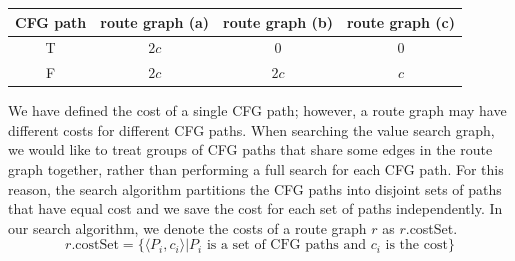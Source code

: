 \begin{center}
\begin{tabular}{|c|c|c|c|}
  \hline
  CFG path & route graph (a) & route graph (b) & route graph (c) \\
  \hline\hline
  T & $2c$ & $0$ & 0 \\
  \hline
  F & $2c$ & $2c$ & $c$ \\
  \hline
\end{tabular}
\end{center}

We have defined the cost of a single CFG path; however, a route graph may have different costs for different CFG paths.
When searching the value search graph, we would like to treat groups of CFG paths that share some edges in the route graph together, rather than performing a full search for each CFG path.
For this reason, the search algorithm partitions the CFG paths into disjoint sets of paths that have equal cost and we save the cost for each set of paths independently. 
In our search algorithm, we denote the costs of a route graph $r$ as $r.$costSet.
\[ r.\text{costSet} = \{ \langle P_{i}, c_{i} \rangle | P_{i}\text{ is a set of CFG paths and } c_{i} \text{ is the cost}\} \]



